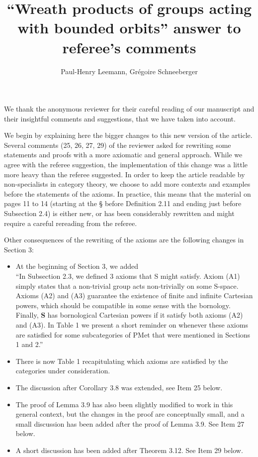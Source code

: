 \documentclass[english,a4paper]{article}
\title{``Wreath products of groups acting with bounded orbits'' answer to referee's comments}
\author{Paul-Henry Leemann, Grégoire Schneeberger}
\begin{document}
\maketitle
%
%
%
%
%
%
%
%
%
%
We thank the anonymous reviewer for their careful reading of our manuscript and their insightful comments and suggestions, that we have taken into account.

We begin by explaining here the bigger changes to this new version of the article.
Several comments (25, 26, 27, 29) of the reviewer asked for rewriting some statements and proofs with a more axiomatic and general approach. While we agree with the referee suggestion, the implementation of this change was a little more heavy than the referee suggested. In order to keep the article readable by non-specialists in category theory, we choose to add more contexts and examples before the statements of the axioms.
In practice, this means that the material on pages 11 to 14 (starting at the § before Definition 2.11 and ending just before Subsection 2.4) is either new, or has been considerably rewritten and might require a careful rereading from the referee.

Other consequences of the rewriting of the axioms are the following changes in Section 3:
\begin{itemize}
\item At the beginning of Section 3, we added\\
``In Subsection 2.3, we defined 3 axioms that S might satisfy. Axiom (A1) simply states that a non-trivial group acts non-trivially on some S-space. Axioms (A2) and (A3) guarantee the existence of finite and infinite Cartesian powers, which should be compatible in some sense with the bornology. Finally, \textbf{S} has bornological Cartesian powers if it satisfy both axioms (A2) and (A3). In Table 1 we present a short reminder on whenever these axioms are satisfied for some subcategories of PMet that were mentioned in Sections 1 and 2.''
\item There is now Table 1 recapitulating which axioms are satisfied by the categories under consideration.
\item The discussion after Corollary 3.8 was extended, see Item 25 below.
\item The proof of Lemma 3.9 has also been slightly modified to work in this general context, but the changes in the proof are conceptually small, and a small discussion has been added after the proof of Lemma 3.9.
See Item 27 below.
\item A short discussion has been added after Theorem 3.12. See Item 29 below.
\end{itemize}
\end{document}
